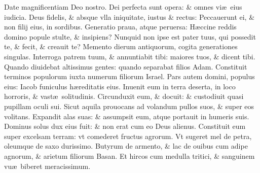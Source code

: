 \documentclass[a5paper,10pt]{book}
\def\ae{æ}
\begin{document}
\begin{multicols*}{2}
\newline \color{red} D\color{black}ate magnificentiam Deo nostro. Dei perfecta sunt opera: \& omnes vi\ae \ eius iudicia.
\newline \color{red} D\color{black}eus fidelis, \& absque vlla iniquitate, iustus \& rectus: Peccauerunt ei, \& non filij eius, in sordibus.
\newline \color{red} G\color{black}eneratio praua, atque peruersa: H\ae ccine reddis domino popule stulte, \& insipiens?
\newline \color{red} N\color{black}unquid non ipse est pater tuus, qui possedit te, \& fecit, \& creauit te?
\newline \color{red} M\color{black}emento dierum antiquorum, cogita generationes singulas.
\newline \color{red} I\color{black}nterroga patrem tuum, \& annuntiabit tibi: maiores tuos, \& dicent tibi.
\newline \color{red} Q\color{black}uando diuidebat altissimus gentes: quando separabat filios Adam.
\newline \color{red} C\color{black}onstituit terminos populorum iuxta numerum filiorum Israel.
\newline \color{red} P\color{black}ars autem domini, populus eius: Iacob funiculus h\ae reditatis eius.
\newline \color{red} I\color{black}nuenit eum in terra deserta, in loco horroris, \& vast\ae \ solitudinis.
\newline \color{red} C\color{black}ircunduxit eum, \& docuit: \& custodiuit quasi pupillam oculi sui.
\newline \color{red} S\color{black}icut aquila prouocans ad volandum pullos suos, \& super eos volitans.
\newline \color{red} E\color{black}xpandit alas suas: \& assumpsit eum, atque portauit in humeris suis.
\newline \color{red} D\color{black}ominus solus dux eius fuit: \& non erat cum eo Deus alienus.
\newline \color{red} C\color{black}onstituit eum super excelsam terram: vt comederet fructus agrorum.
\newline \color{red} V\color{black}t sugeret mel de petra, oleumque de saxo durissimo.
\newline \color{red} B\color{black}utyrum de armento, \& lac de ouibus cum adipe agnorum, \& arietum filiorum Basan.
\newline \color{red} E\color{black}t hircos cum medulla tritici, \& sanguinem vu\ae \ biberet meracissimum.

\end{multicols*}
\end{document}
